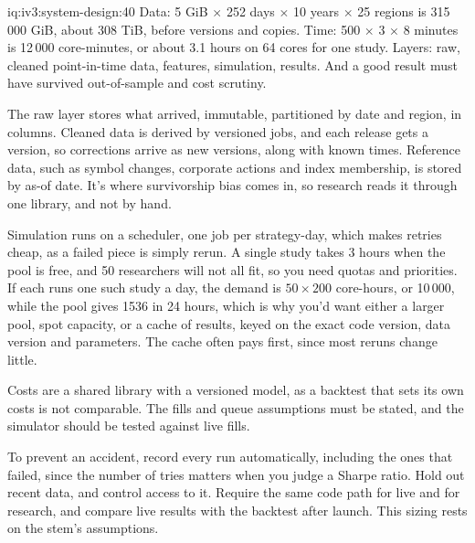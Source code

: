\begin{solution}{iq:iv3:system-design:40}
Data: 5 GiB $\times$ 252 days $\times$ 10 years $\times$ 25 regions is 315\,000 GiB, about 308 TiB, before versions and copies. Time: 500 $\times$ 3 $\times$ 8 minutes is 12\,000 core-minutes, or about 3.1 hours on 64 cores for one study. Layers: raw, cleaned point-in-time data, features, simulation, results. And a good result must have survived out-of-sample and cost scrutiny.

The raw layer stores what arrived, immutable, partitioned by date and region, in columns. Cleaned data is derived by versioned jobs, and each release gets a version, so corrections arrive as new versions, along with known times. Reference data, such as symbol changes, corporate actions and index membership, is stored by as-of date. It's where survivorship bias comes in, so research reads it through one library, and not by hand.

Simulation runs on a scheduler, one job per strategy-day, which makes retries cheap, as a failed piece is simply rerun. A single study takes 3 hours when the pool is free, and 50 researchers will not all fit, so you need quotas and priorities. If each runs one such study a day, the demand is $50 \times 200$ core-hours, or 10\,000, while the pool gives 1536 in 24 hours, which is why you'd want either a larger pool, spot capacity, or a cache of results, keyed on the exact code version, data version and parameters. The cache often pays first, since most reruns change little.

Costs are a shared library with a versioned model, as a backtest that sets its own costs is not comparable. The fills and queue assumptions must be stated, and the simulator should be tested against live fills.

To prevent an accident, record every run automatically, including the ones that failed, since the number of tries matters when you judge a Sharpe ratio. Hold out recent data, and control access to it. Require the same code path for live and for research, and compare live results with the backtest after launch. This sizing rests on the stem's assumptions.

\end{solution}
